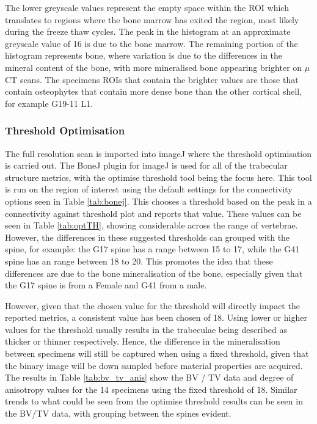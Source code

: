 The lower greyscale values represent the empty space within the ROI which
translates to regions where the bone marrow has exited the region, most likely
during the freeze thaw cycles. The peak in the histogram at an approximate
greyscale value of 16 is due to the bone marrow. The remaining portion of the
histogram represents bone, where variation is due to the differences in the
mineral content of the bone, with more mineralised bone appearing brighter on
$\mu$CT scans. The specimens ROIs that contain the brighter values are those
that contain osteophytes that contain more dense bone than the other cortical
shell, for example G19-11 L1.

\subsubsection{Threshold Optimisation}


The full resolution scan is imported into imageJ where the threshold
optimisation is carried out. The BoneJ plugin for imageJ is used for all of the
trabecular structure metrics, with the optimise threshold tool being the focus
here. This tool is run on the region of interest using the default settings for
the connectivity options seen in Table \ref{tab:bonej}. This chooses a threshold
based on the peak in a connectivity against threshold plot and reports that
value. These values can be seen in Table \ref{tab:optTH}, showing considerable
across the range of vertebrae. However, the differences in these suggested
thresholds can grouped with the spine, for example: the G17 spine has a range
between 15 to 17, while the G41 spine has an range between 18 to 20. This
promotes the idea that these differences are due to the bone mineralisation of
the bone, especially given that the G17 spine is from a Female and G41 from a
male.

However, given that the chosen value for the threshold will directly impact the
reported metrics, a consistent value has been chosen of 18. Using lower or
higher values for the threshold usually results in the trabeculae being
described as thicker or thinner respectively. Hence, the difference in the
mineralisation between specimens will still be captured when using a fixed
threshold, given that the binary image will be down sampled before material
properties are acquired. The results in Table \ref{tab:bv_tv_anis} show the BV /
TV data and degree of anisotropy values for the 14 specimens using the fixed
threshold of 18. Similar trends to what could be seen from the optimise
threshold results can be seen in the BV/TV data, with grouping between the
spines evident.

